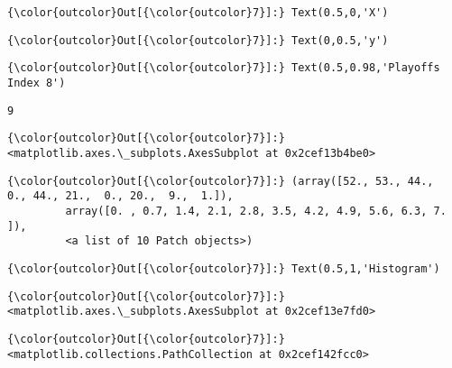 \documentclass[11pt]{article}
\begin{document}
\begin{Verbatim}[commandchars=\\\{\}]
{\color{outcolor}Out[{\color{outcolor}7}]:} Text(0.5,0,'X')
\end{Verbatim}
            
\begin{Verbatim}[commandchars=\\\{\}]
{\color{outcolor}Out[{\color{outcolor}7}]:} Text(0,0.5,'y')
\end{Verbatim}
            
\begin{Verbatim}[commandchars=\\\{\}]
{\color{outcolor}Out[{\color{outcolor}7}]:} Text(0.5,0.98,'Playoffs Index 8')
\end{Verbatim}
            
    \begin{Verbatim}[commandchars=\\\{\}]
9

    \end{Verbatim}

\begin{Verbatim}[commandchars=\\\{\}]
{\color{outcolor}Out[{\color{outcolor}7}]:} <matplotlib.axes.\_subplots.AxesSubplot at 0x2cef13b4be0>
\end{Verbatim}
            
\begin{Verbatim}[commandchars=\\\{\}]
{\color{outcolor}Out[{\color{outcolor}7}]:} (array([52., 53., 44.,  0., 44., 21.,  0., 20.,  9.,  1.]),
         array([0. , 0.7, 1.4, 2.1, 2.8, 3.5, 4.2, 4.9, 5.6, 6.3, 7. ]),
         <a list of 10 Patch objects>)
\end{Verbatim}
            
\begin{Verbatim}[commandchars=\\\{\}]
{\color{outcolor}Out[{\color{outcolor}7}]:} Text(0.5,1,'Histogram')
\end{Verbatim}
            
\begin{Verbatim}[commandchars=\\\{\}]
{\color{outcolor}Out[{\color{outcolor}7}]:} <matplotlib.axes.\_subplots.AxesSubplot at 0x2cef13e7fd0>
\end{Verbatim}
            
\begin{Verbatim}[commandchars=\\\{\}]
{\color{outcolor}Out[{\color{outcolor}7}]:} <matplotlib.collections.PathCollection at 0x2cef142fcc0>
\end{Verbatim}
            
\end{document}
